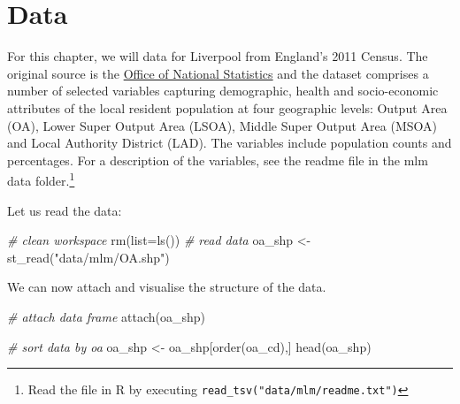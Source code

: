\documentclass[
]{book}
\newenvironment{Shaded}{\begin{snugshade}}{\end{snugshade}}
\newcommand{\AttributeTok}[1]{\textcolor[rgb]{0.77,0.63,0.00}{#1}}
\newcommand{\CommentTok}[1]{\textcolor[rgb]{0.56,0.35,0.01}{\textit{#1}}}
\newcommand{\FunctionTok}[1]{\textcolor[rgb]{0.00,0.00,0.00}{#1}}
\newcommand{\NormalTok}[1]{#1}
\newcommand{\OtherTok}[1]{\textcolor[rgb]{0.56,0.35,0.01}{#1}}
\newcommand{\StringTok}[1]{\textcolor[rgb]{0.31,0.60,0.02}{#1}}
\begin{document}
\hypertarget{data-3}{%
\section{Data}\label{data-3}}

For this chapter, we will data for Liverpool from England's 2011 Census. The original source is the \href{https://www.nomisweb.co.uk/home/census2001.asp}{Office of National Statistics} and the dataset comprises a number of selected variables capturing demographic, health and socio-economic attributes of the local resident population at four geographic levels: Output Area (OA), Lower Super Output Area (LSOA), Middle Super Output Area (MSOA) and Local Authority District (LAD). The variables include population counts and percentages. For a description of the variables, see the readme file in the mlm data folder.\footnote{Read the file in R by executing \texttt{read\_tsv("data/mlm/readme.txt")}}

Let us read the data:

\begin{Shaded}
\begin{Highlighting}[]
\CommentTok{\# clean workspace}
\FunctionTok{rm}\NormalTok{(}\AttributeTok{list=}\FunctionTok{ls}\NormalTok{())}
\CommentTok{\# read data}
\NormalTok{oa\_shp }\OtherTok{\textless{}{-}} \FunctionTok{st\_read}\NormalTok{(}\StringTok{"data/mlm/OA.shp"}\NormalTok{)}
\end{Highlighting}
\end{Shaded}

We can now attach and visualise the structure of the data.

\begin{Shaded}
\begin{Highlighting}[]
\CommentTok{\# attach data frame}
\FunctionTok{attach}\NormalTok{(oa\_shp)}

\CommentTok{\# sort data by oa}
\NormalTok{oa\_shp }\OtherTok{\textless{}{-}}\NormalTok{ oa\_shp[}\FunctionTok{order}\NormalTok{(oa\_cd),]}
\FunctionTok{head}\NormalTok{(oa\_shp)}
\end{Highlighting}
\end{Shaded}
\end{document}

